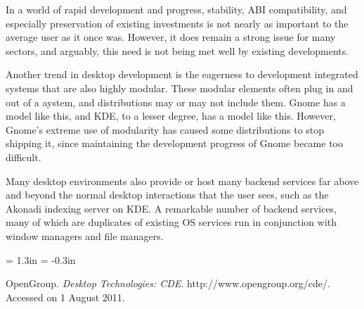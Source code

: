 In a world of rapid development and progress, stability, ABI
compatibility, and especially preservation of existing investments is
not nearly as important to the average user as it once was. However, it
does remain a strong issue for many sectors, and arguably, this need is
not being met well by existing developments.

Another trend in desktop development is the eagerness to development
integrated systems that are also highly modular. These modular elements
often plug in and out of a aystem, and distributions may or may not
include them. Gnome has a model like this, and KDE, to a lesser degree,
has a model like this. However, Gnome’s extreme use of modularity has
caused some distributions to stop shipping it, since maintaining the
development progress of Gnome became too difficult. 

Many desktop environments also provide or host many backend services far
above and beyond the normal desktop interactions that the user sees,
such as the Akonadi indexing server on KDE. A remarkable number of
backend services, many of which are duplicates of existing OS services
run in conjunction with window managers and file managers.









\vfill\break


\leftskip = 1.3in
\parindent = -0.3in

OpenGroup. {\it Desktop Technologies: CDE}. 
http://www.opengroup.org/cde/. Accessed on 1 August 2011.

\bye
